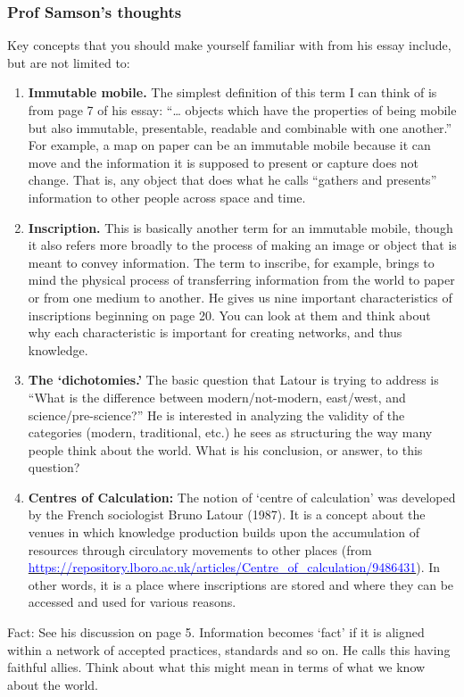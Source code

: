 \documentclass[a4paper]{article}
\begin{document}
\subsubsection{Prof Samson's thoughts}
Key concepts that you should make yourself familiar with from his essay include, but are not limited to:
\begin{enumerate}
	\item \textbf{Immutable mobile. }The simplest definition of this term I can think of is from page 7 of his essay: ``… objects which have the properties of being mobile but also immutable, presentable, readable and combinable with one another.'' For example, a map on paper can be an immutable mobile because it can move and the information it is supposed to present or capture does not change. That is, any object that does what he calls ``gathers and presents'' information to other people across space and time.
	\item \textbf{Inscription.} This is basically another term for an immutable mobile, though it also refers more broadly to the process of making an image or object that is meant to convey information. The term to inscribe, for example, brings to mind the physical process of transferring information from the world to paper or from one medium to another. He gives us nine important characteristics of inscriptions beginning on page 20. You can look at them and think about why each characteristic is important for creating networks, and thus knowledge.
	\item \textbf{The `dichotomies.'} The basic question that Latour is trying to address is ``What is the difference between modern/not-modern, east/west, and science/pre-science?'' He is interested in analyzing the validity of the categories (modern, traditional, etc.) he sees as structuring the way many people think about the world. What is his conclusion, or answer, to this question?
	\item \textbf{Centres of Calculation:} The notion of `centre of calculation' was developed by the French sociologist Bruno Latour (1987). It is a concept about the venues in which knowledge production builds upon the accumulation of resources through circulatory movements to other places (from \href{https://repository.lboro.ac.uk/articles/Centre_of_calculation/9486431}{\textcolor{blue}{https://repository.lboro.ac.uk/articles/Centre\_of\_calculation/9486431}}). In other words, it is a place where inscriptions are stored and where they can be accessed and used for various reasons. 
\end{enumerate}
\noindent Fact: See his discussion on page 5. Information becomes `fact' if it is aligned within a network of accepted practices, standards and so on. He calls this having faithful allies. Think about what this might mean in terms of what we know about the world.
\end{document}
